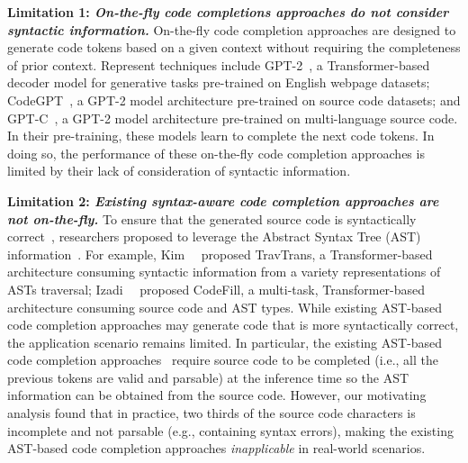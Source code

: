 \textbf{Limitation 1: \emph{On-the-fly code completions approaches do not consider syntactic information.}}
On-the-fly code completion approaches are designed to generate code tokens based on a given context without requiring the completeness of prior context.
Represent techniques include GPT-2~\cite{radford2019language}, a Transformer-based decoder model for generative tasks pre-trained on English webpage datasets; CodeGPT~\cite{lu2021codexglue}, a GPT-2 model architecture pre-trained on source code datasets; and GPT-C~\cite{svyatkovskiy2020intellicode}, a GPT-2 model architecture pre-trained on multi-language source code. In their pre-training, these models learn to complete the next code tokens. 
In doing so, the performance of these on-the-fly code completion approaches is limited by their lack of consideration of syntactic information.

\textbf{Limitation 2: \emph{Existing syntax-aware code completion approaches are not on-the-fly.}}
To ensure that the generated source code is syntactically correct~\cite{brockschmidt2018generative}, researchers proposed to leverage the Abstract Syntax Tree (AST) information~\cite{li2017code, svyatkovskiy2019pythia, kim2021code, liu2020self, izadi2022codefill, liu2022unified}.
For example, Kim~\ea~\cite{kim2021code} proposed TravTrans, 
a Transformer-based architecture consuming syntactic information from a variety representations of ASTs traversal;
Izadi~\ea~\cite{izadi2022codefill} proposed CodeFill, a multi-task,  
Transformer-based architecture consuming source code and AST types. 
While existing AST-based code completion approaches may generate code that is more syntactically correct, the application scenario remains limited.
In particular, the existing AST-based code completion approaches~\cite{li2017code, svyatkovskiy2019pythia, kim2021code, liu2020self, izadi2022codefill, liu2022unified} require source code to be completed (i.e., all the previous tokens are valid and parsable) at the inference time so the AST information can be obtained from the source code.
However, our motivating analysis found that in practice, two thirds of the source code characters is incomplete and not parsable (e.g., containing syntax errors), making the existing AST-based code completion approaches \emph{inapplicable} in real-world scenarios.




